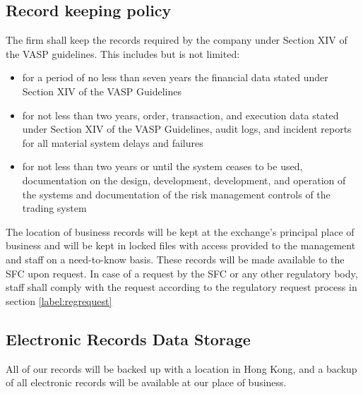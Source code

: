\subsection{Record keeping policy}
The firm shall keep the records required by the company under Section
XIV of the VASP guidelines.  This includes but is not limited:
\label{label:reckeep}

\begin{itemize}
  \item for a period of no less than seven years the financial data
    stated under Section XIV of the VASP Guidelines
  \item for not less than two years, order, transaction, and execution
    data stated under Section XIV of the VASP Guidelines, audit logs, and incident reports for all material system delays and failures
  \item for not less than two years or until the system ceases to be
    used, documentation on the design, development, development, and
    operation of the systems and documentation of the risk management
    controls of the trading system
\end{itemize}

The location of business records will be kept at the exchange's principal
place of business and will be kept in locked files with access
provided to the management and staff on a need-to-know basis.  These
records will be made available to the SFC upon request.  In case of a
request by the SFC or any other regulatory body, staff shall comply
with the request according to the regulatory request process in
section \ref{label:regrequest}

\subsection{Electronic Records Data Storage}
All of our records will be backed up with a location in Hong Kong, and
a backup of all electronic records will be available at our place of business.
